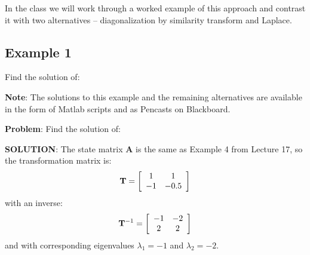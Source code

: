 
\ifslidesonly
\begin{slide}
   
\end{slide}
\fi



\ifslidesonly
\begin{slide}
   
\end{slide}
\fi



\ifslidesonly
\begin{slide}
   
\end{slide}
\fi

\ifslidesonly
\begin{slide}
In the class we will work through a worked example of this approach
and contrast it with two alternatives -- diagonalization by similarity transform
and Laplace.
\end{slide}
\fi

\subsection*{Example 1}
\ifslidesonly
\begin{slide}
Find the solution of:

{\bf Note}: The solutions to this example and the remaining alternatives
 are available in the form of Matlab scripts and as Pencasts on Blackboard.
\end{slide}
\fi
\textbf{Problem}: Find the solution of:


\textbf{SOLUTION}: The state matrix $\mathbf{A}$ is the same as Example 4 from Lecture 17, so the transformation matrix is:
\[
{\bf{T}} = \left[ {\begin{array}{*{20}c}
   1 & 1  \\
   { - 1} & { - 0.5}  \\
\end{array}} \right]
\]
with an inverse:
\[
{\bf{T}}^{ - 1}  = \left[ {\begin{array}{*{20}c}
   { - 1} & { - 2}  \\
   2 & 2  \\
\end{array}} \right]
\]
and with corresponding eigenvalues $\lambda_1=-1$ and $\lambda_2=-2$.

